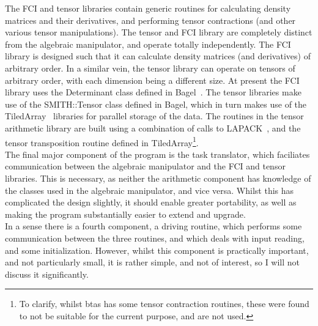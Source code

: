 \noindent The FCI and tensor libraries contain generic routines for calculating
density matrices and their derivatives, and performing tensor contractions (and
other various tensor manipulations). The tensor and FCI library are completely
distinct from the algebraic manipulator, and operate totally independently. The
FCI library is designed such that it can calculate density matrices (and
derivatives) of arbitrary order. In a similar vein, the tensor library can
operate on tensors of arbitrary order, with each dimension being a different
size. At present the FCI  library uses the Determinant class defined in
Bagel~\cite{BAGEL}. The tensor libraries make use of the SMITH::Tensor class
defined in Bagel, which in turn makes use of the TiledArray~\cite{TiledArray}
libraries for parallel storage of the data.  The routines in the tensor
arithmetic library are built using a combination of calls to
LAPACK~\cite{LAPACK}, and the tensor transposition routine defined in
TiledArray\footnote{ To clarify, whilst btas has some tensor contraction
routines, these were found to not be suitable for the current purpose, and are
not used.}.\\

\noindent The final major component of the program is the task translator,
which faciliates communication between the algebraic manipulator and the 
FCI and tensor libraries. This is necessary, as
neither the arithmetic component has knowledge of the classes used in
the algebraic manipulator, and vice versa. Whilst this has complicated the
design slightly, it should enable greater portability, as well as making the
program substantially easier to extend and upgrade.\\ 

\noindent In a sense there is a fourth component, a driving routine, which
performs some communication between the three routines, and which deals with
input reading, and some initialization. However, whilst this component is practically
important, and not particularly small, it is rather simple, and not of
interest, so I will not discuss it significantly.

